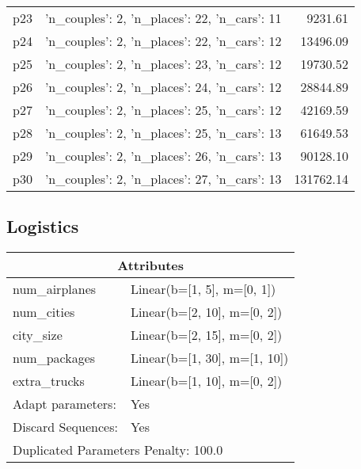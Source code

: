 \documentclass{article}
\begin{document}
\begin{center}
\begin{tabular}{@{}l|r|r@{}}
  p23&{'n\_couples': 2, 'n\_places': 22, 'n\_cars': 11}&9231.61\\
  p24&{'n\_couples': 2, 'n\_places': 22, 'n\_cars': 12}&13496.09\\
  p25&{'n\_couples': 2, 'n\_places': 23, 'n\_cars': 12}&19730.52\\
  p26&{'n\_couples': 2, 'n\_places': 24, 'n\_cars': 12}&28844.89\\
  p27&{'n\_couples': 2, 'n\_places': 25, 'n\_cars': 12}&42169.59\\
  p28&{'n\_couples': 2, 'n\_places': 25, 'n\_cars': 13}&61649.53\\
  p29&{'n\_couples': 2, 'n\_places': 26, 'n\_cars': 13}&90128.10\\
  p30&{'n\_couples': 2, 'n\_places': 27, 'n\_cars': 13}&131762.14
                            \end{tabular}
                            \end{center}
                    
                            \newpage \subsection{Logistics}
                    \begin{center}
                    \begin{tabular}{@{}p{}p{}@{}}
                    \multicolumn{2}{c}{\bf \large Attributes}\\\midrule
                    num\_airplanes & Linear(b=[1, 5], m=[0, 1])\\
num\_cities & Linear(b=[2, 10], m=[0, 2])\\
city\_size & Linear(b=[2, 15], m=[0, 2])\\
num\_packages & Linear(b=[1, 30], m=[1, 10])\\
extra\_trucks & Linear(b=[1, 10], m=[0, 2])
                    \\\midrule
                    Adapt parameters: & Yes
                                \\\midrule
                                Discard Sequences: & Yes \\\midrule
                    \multicolumn{2}{l}{Duplicated Parameters Penalty: 100.0}
                    \end{tabular}
                    \end{center}
                
\end{document}
